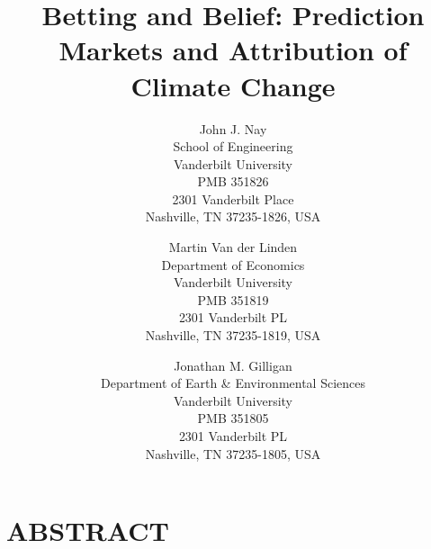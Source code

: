 \documentclass{wscpaperproc}\usepackage[]{graphicx}\usepackage[]{color}
\begin{document}
%
%

\title{Betting and Belief: Prediction Markets and Attribution of Climate Change}

\author{John J. Nay\\ [12pt]
School of Engineering\\
Vanderbilt University \\
PMB 351826 \\
2301 Vanderbilt Place\\
Nashville, TN 37235-1826, USA
\and
Martin Van der Linden\\ [12pt]
Department of Economics\\
Vanderbilt University\\
PMB 351819\\
2301 Vanderbilt PL\\
Nashville, TN 37235-1819, USA\\
\and
Jonathan M. Gilligan\\ [12pt]
Department of Earth \& Environmental Sciences\\
Vanderbilt University\\
PMB 351805\\
2301 Vanderbilt PL\\
Nashville, TN 37235-1805, USA
}

\maketitle
\section*{ABSTRACT}
\end{document}
